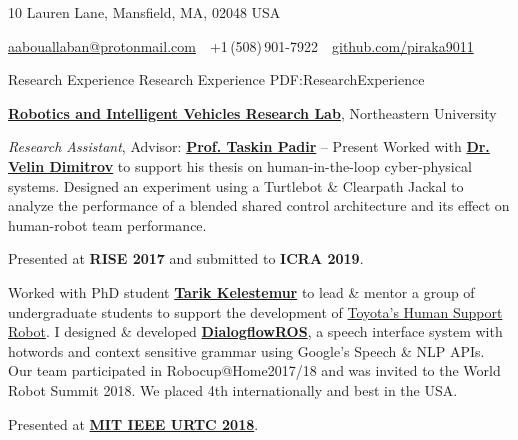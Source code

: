 \documentclass[letterpaper,MMMyyyy,nonstopmode]{simpleresumecv}
\newcommand{\CVAuthor}{Anas Abou Allaban}
\newcommand{\CVWebpage}{github.com/piraka9011}
\begin{document}

\Title{\CVAuthor}

\begin{SubTitle}
10 Lauren Lane, Mansfield, MA, 02048 USA
\par
\href{mailto:aabouallaban@protonmail.com}
{aabouallaban@protonmail.com}
\,\SubBulletSymbol\,
+1\,(508)\,901-7922
\,\SubBulletSymbol\,
\href{\CVWebpage}
{\url{\CVWebpage}}
\end{SubTitle}

\begin{Body}



\Section
{Research Experience}
{Research Experience}
{PDF:ResearchExperience}

\Entry
\href{http://robot.neu.edu/}
{\textbf{Robotics and Intelligent Vehicles Research Lab}},
Northeastern University

\Gap
\textit{Research Assistant}, Advisor: 
\href{tpadir.info}{\textbf{Prof. Taskin Padir}}
\hfill
{} -- Present
\BulletItem 
Worked with \textbf{\href{https://www.linkedin.com/in/velin-dimitrov/}{Dr. Velin Dimitrov}} to support his thesis on human-in-the-loop cyber-physical systems. Designed an experiment using a Turtlebot \& Clearpath Jackal to analyze the performance of a blended shared control architecture and its effect on human-robot team performance.
\begin{Detail}
	\Item
	Presented at \textbf{RISE 2017} and submitted to \textbf{ICRA 2019}.
\end{Detail}
\BulletItem 
Worked with PhD student \href{http://kelestemur.com/}{\textbf{Tarik Kelestemur}} to lead \& mentor a group of undergraduate students to support the development of \href{http://www.toyota-global.com/innovation/partner_robot/family_2.html}{Toyota's Human Support Robot}. I designed \& developed \href{http://wiki.ros.org/dialogflow_ros}{\textbf{DialogflowROS}}, a speech interface system with hotwords and context sensitive grammar using Google's Speech \& NLP APIs. Our team participated in Robocup@Home2017/18 and was invited to the World Robot Summit 2018. We placed 4th internationally and best in the USA.
\begin{Detail}
	\Item
	Presented at \href{http://ieee.scripts.mit.edu/conference/}{\textbf{MIT IEEE URTC 2018}}.
\end{Detail}
\SectionSpace


\end{Body}
\end{document}
